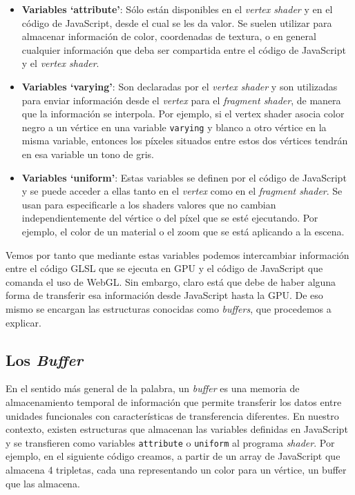 \begin{itemize}
    \item \textbf{Variables `attribute'}: Sólo están disponibles en el \textit{vertex shader} y en el código de JavaScript, desde el cual se les da valor. Se suelen utilizar para almacenar información de color, coordenadas de textura, o en general cualquier información que deba ser compartida entre el código de JavaScript y el \textit{vertex shader}.
    \item \textbf{Variables `varying'}: Son declaradas por el \textit{vertex shader} y son utilizadas para enviar información desde el \textit{vertex} para el \textit{fragment shader}, de manera que la información se interpola. Por ejemplo, si el vertex shader asocia color negro a un vértice en una variable \verb|varying| y blanco a otro vértice en la misma variable, entonces los píxeles situados entre estos dos vértices tendrán en esa variable un tono de gris.
    \item \textbf{Variables `uniform'}: Estas variables se definen por el código de JavaScript y se puede acceder a ellas tanto en el \textit{vertex} como en el \textit{fragment shader}. Se usan para especificarle a los shaders valores que no cambian independientemente del vértice o del píxel que se esté ejecutando. Por ejemplo, el color de un material o el zoom que se está aplicando a la escena.
\end{itemize}

Vemos por tanto que mediante estas variables podemos intercambiar información entre el código GLSL que se ejecuta en GPU y el código de JavaScript que comanda el uso de WebGL. Sin embargo, claro está que debe de haber alguna forma de transferir esa información desde JavaScript hasta la GPU. De eso mismo se encargan las estructuras conocidas como \textit{buffers}, que procedemos a explicar.

\subsection{Los \textit{Buffer}}
\label{subsection:buffer}

En el sentido más general de la palabra, un \textit{buffer} es una memoria de almacenamiento temporal de información que permite transferir los datos entre unidades funcionales con características de transferencia diferentes. En nuestro contexto, existen estructuras que almacenan las variables definidas en JavaScript y se transfieren como variables \verb|attribute| o \verb|uniform| al programa \textit{shader}. Por ejemplo, en el siguiente código creamos, a partir de un array de JavaScript que almacena 4 tripletas, cada una representando un color para un vértice, un buffer que las almacena.


